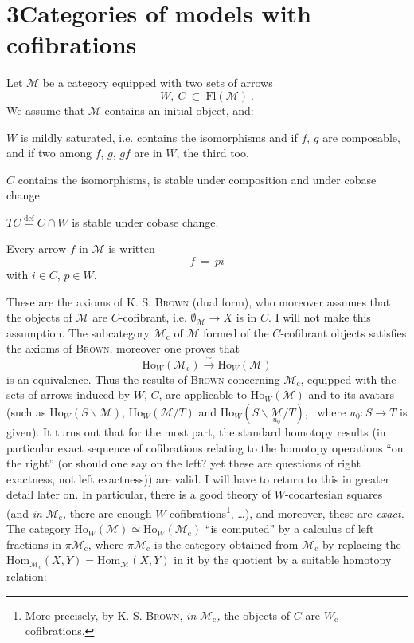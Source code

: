 \documentclass[11pt]{article}
\newcommand{\printedpage}[1]{\marginpar{\footnotesize p.~#1}}
\newcommand{\msp}[1]{\marginpar{\footnotesize [#1]}}
\newcommand{\M}{\mathcal{M}}
\newcommand{\Mc}{\mathcal{M}_{\mathrm{c}}}
\begin{document}
\section*{3\quad Categories of models with cofibrations}

Let $\M$ be a category equipped with two sets of arrows
\[ W,\ C\ \subset\ \mathrm{Fl}(\M)\ . \]
We assume that $\M$ contains an initial object, and:
\begin{description}[leftmargin=3em, labelwidth=2.5em]
\item[Cof$_0$] $W$ is mildly saturated, i.e. contains the isomorphisms and if $f$, $g$ are composable, and if two among $f$, $g$, $gf$ are in $W$, the third too.
\item[Cof$_1$] $C$ contains the isomorphisms, is stable under composition and under cobase change.
\item[Cof$_2$] $TC \overset{\text{def}}{=} C \cap W$ is stable under cobase change.
\item[Cof$_3$] Every arrow $f$ in $\M$ is written
\[ f \ = \ pi \]
with $i \in C$, $p \in W$.
\end{description}
These are the axioms of K. S. \textsc{Brown} (dual form), who moreover assumes that the objects of $\M$ are $C$-cofibrant, i.e. $\emptyset_{\M} \longrightarrow X$ is in $C$. I will not make this assumption. The subcategory $\Mc$ of $\M$ formed of the \msp{40} $C$-cofibrant objects satisfies the axioms of \textsc{Brown}, moreover one proves that
\[ \mathrm{Ho}_W(\Mc) \xrightarrow{\ \sim\ } \mathrm{Ho}_W(\M) \]
is an equivalence. Thus the results of \textsc{Brown} concerning $\Mc$, equipped with the sets of arrows induced by $W$, $C$, are applicable to $\mathrm{Ho}_W(\M)$ and to its avatars (such as $\mathrm{Ho}_W(S\backslash\M)$, $\mathrm{Ho}_W(\M/T)$ and $\mathrm{Ho}_W(S\backslash\underset{u_0}{\M}/T)$, \ where $u_0 : S \longrightarrow T$ is given). It turns out that for the most part, the standard homotopy results (in particular exact sequence of cofibrations relating to the homotopy operations ``on the right'' (or should one say on the left? yet these are questions of right exactness, not left exactness)) are valid. I will have to return to this in greater detail later on. In particular, there is a good theory of $W$-cocartesian squares (and \textit{in} $\Mc$\textit{,} there are enough $W$-cofibrations\footnote[14]{More precisely, by K. S. \textsc{Brown}, \textit{in} $\Mc$\textit{,} the objects of $C$ are $W_{\mathrm{c}}$-cofibrations.}, \ldots),
\printedpage{22}
\msp{41}
and moreover, these are \textit{exact.} The category $\mathrm{Ho}_W(\M) \simeq \mathrm{Ho}_W(\Mc)$ ``is computed'' by a calculus of left fractions in $\pi\Mc$, where $\pi\Mc$ is the category obtained from $\Mc$ by replacing the $\mathrm{Hom}_{\Mc}(X,Y) = \mathrm{Hom}_{\M}(X,Y)$ in it by the quotient by a suitable homotopy relation:
\end{document}
